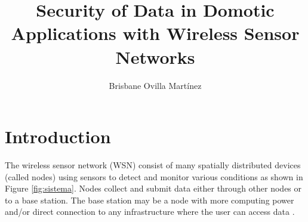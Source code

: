 \documentclass[ENG,PhD]{lti-tech-report}
\title{Security of Data in Domotic Applications with Wireless Sensor Networks}
\author {Brisbane Ovilla Martínez}
\begin{document}
\makeintropages
\section{Introduction}

The wireless sensor network (WSN) consist of many spatially distributed devices (called nodes) using sensors to detect and monitor various conditions as shown in Figure \ref{fig:sistema}. Nodes collect and submit data either through other nodes or to a base station.  The base station may be a node with more computing power and/or direct connection to any infrastructure where the user can access data \cite{Al-Karaki:2004uq}.



\newpage
%
%


\end{document}
